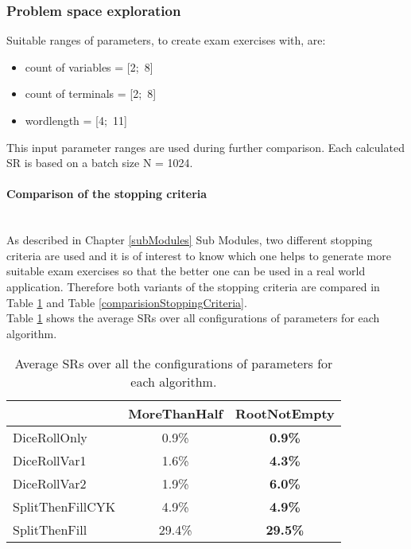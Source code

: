 \subsubsection{Problem space exploration}
Suitable ranges of parameters, to create exam exercises with, are:
\begin{itemize}[noitemsep,nolistsep]
	\item count of variables = [2;~8]
	\item count of terminals = [2;~8]
	\item wordlength = [4;~11]
\end{itemize}
This input parameter ranges are used during further comparison. Each calculated SR is based on a batch size N = 1024.
\clearpage
\paragraph{Comparison of the stopping criteria}~\\
As described in Chapter \ref{subModules} Sub Modules, two different stopping criteria  are used and it is of interest to know which one helps to generate more suitable exam exercises so that the better one can be used in a real world application. Therefore both variants of the stopping criteria are compared in Table \ref{comparisionMeanValue} and Table \ref{comparisionStoppingCriteria}.\\
Table \ref{comparisionMeanValue} shows the average SRs over all configurations of parameters for each algorithm.

\begin{table}[h]
	\centering
	\begin{tabular}{l|c|c|}
		\cline{2-3}
		& MoreThanHalf & RootNotEmpty \\ \hline
		\multicolumn{1}{|l|}{DiceRollOnly}  & 0.9\%             & \textbf{0.9\%}            \\ \hline
		\multicolumn{1}{|l|}{DiceRollVar1}  & 1.6\%             & \textbf{4.3\%}            \\ \hline
		\multicolumn{1}{|l|}{DiceRollVar2}  & 1.9\%             & \textbf{6.0\%}            \\ \hline
		\multicolumn{1}{|l|}{SplitThenFillCYK} & 4.9\%             & \textbf{4.9\%}            \\ \hline
		\multicolumn{1}{|l|}{SplitThenFill}  & 29.4\%             & \textbf{29.5\%}             \\ \hline
	\end{tabular}
	\caption{Average SRs over all the configurations of parameters for each algorithm.}
	\label{comparisionMeanValue}
\end{table}

